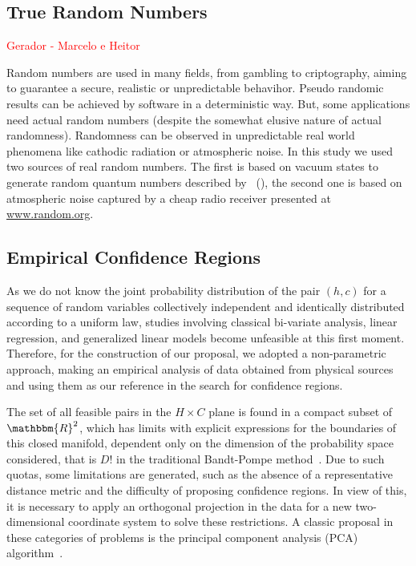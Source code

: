 
\subsection{True Random Numbers}

\textcolor{red}{Gerador - Marcelo e Heitor}

Random numbers are used in many fields, from gambling to criptography, aiming to guarantee a secure, realistic or unpredictable behavihor. 
Pseudo randomic results can be achieved by software in a deterministic way. 
But, some applications need actual random numbers (despite the somewhat elusive nature of actual randomness).
Randomness can be observed in unpredictable real world phenomena like cathodic radiation or atmospheric noise.
In this study we used two sources of real random numbers. 
The first is based on vacuum states to generate random quantum numbers described by \citeauthor{Wittmann2010generator}~(\citeyear{Wittmann2010generator}), the second one is based on atmospheric noise captured by a cheap radio receiver presented at \url{www.random.org}.



\subsection{Empirical Confidence Regions}

As we do not know the joint probability distribution of the pair $(h, c)$ for a sequence of random variables collectively independent and identically distributed according to a uniform law, studies involving classical bi-variate analysis, linear regression, and generalized linear models become unfeasible at this first moment.
Therefore, for the construction of our proposal, we adopted a non-parametric approach, making an empirical analysis of data obtained from physical sources and using them as our reference in the search for confidence regions.

The set of all feasible pairs in the $H \times C$ plane is found in a compact subset of $\mathbbm{R}^2$, which has limits with explicit expressions for the boundaries of this closed manifold, dependent only on the dimension of the probability space considered, that is $D!$ in the traditional Bandt-Pompe method~\cite{martin2006generalized}.
Due to such quotas, some limitations are generated, such as the absence of a representative distance metric and the difficulty of proposing confidence regions.
In view of this, it is necessary to apply an orthogonal projection in the data for a new two-dimensional coordinate system to solve these restrictions.
A classic proposal in these categories of problems is the principal component analysis (PCA) algorithm~\cite{wold1987principal}.

